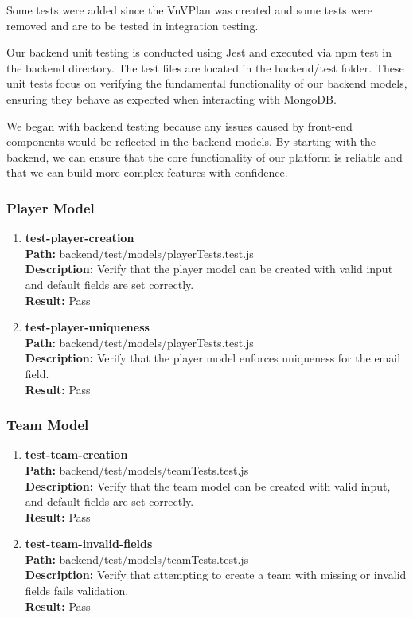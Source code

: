 \documentclass[12pt, titlepage]{article}
\begin{document}
Some tests were added since the VnVPlan was created and some tests were removed and are to be tested in integration testing.

Our backend unit testing is conducted using Jest and executed via npm test in the backend directory. The test files are located in the backend/test folder. These unit tests focus on verifying the fundamental functionality of our backend models, ensuring they behave as expected when interacting with MongoDB.

We began with backend testing because any issues caused by front-end components would be reflected in the backend models. By starting with the backend, we can ensure that the core functionality of our platform is reliable and that we can build more complex features with confidence.

\subsubsection{Player Model}

\begin{enumerate}
    \item{\textbf{test-player-creation}\\}
        \textbf{Path:} backend/test/models/playerTests.test.js\\
        \textbf{Description:} Verify that the player model can be created with valid input and default fields are set correctly.\\
        \textbf{Result:} Pass

    \item{\textbf{test-player-uniqueness}\\}
        \textbf{Path:} backend/test/models/playerTests.test.js\\
        \textbf{Description:} Verify that the player model enforces uniqueness for the email field.\\
        \textbf{Result:} Pass
\end{enumerate}
\subsubsection{Team Model}
\begin{enumerate}
    \item{\textbf{test-team-creation}\\}
        \textbf{Path:} backend/test/models/teamTests.test.js\\
        \textbf{Description:} Verify that the team model can be created with valid input, and default fields are set correctly.\\
        \textbf{Result:} Pass

    \item{\textbf{test-team-invalid-fields}\\}
        \textbf{Path:} backend/test/models/teamTests.test.js\\
        \textbf{Description:} Verify that attempting to create a team with missing or invalid fields fails validation.\\
        \textbf{Result:} Pass
\end{enumerate}
\end{document}
